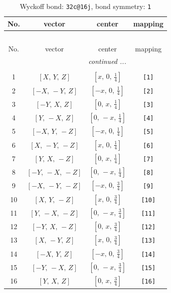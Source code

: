 \documentclass[fleqn,8pt]{jsarticle}
\begin{document}
\begin{longtable}{cccc}
\caption{Wyckoff bond: {\tt 32c@16j}, bond symmetry: {\tt 1}}
 \\
 \hline \hline
No. & vector & center & mapping \\ \hline \endfirsthead

\multicolumn{3}{l}{\tablename\ \thetable{}} \\
 \hline \hline
No. & vector & center & mapping \\ \hline \endhead

 \hline \hline
\multicolumn{3}{r}{\footnotesize\it continued ...} \\ \endfoot

 \hline \hline
\multicolumn{3}{r}{} \\ \endlastfoot

1 & $\left[ X,\, Y,\, Z \right]$ & $\left[ x,\, 0,\, \frac{1}{4} \right]$ & {\tt [1]} \\ \hline
2 & $\left[ - X,\, - Y,\, Z \right]$ & $\left[ - x,\, 0,\, \frac{1}{4} \right]$ & {\tt [2]} \\ \hline
3 & $\left[ - Y,\, X,\, Z \right]$ & $\left[ 0,\, x,\, \frac{1}{4} \right]$ & {\tt [3]} \\ \hline
4 & $\left[ Y,\, - X,\, Z \right]$ & $\left[ 0,\, - x,\, \frac{1}{4} \right]$ & {\tt [4]} \\ \hline
5 & $\left[ - X,\, Y,\, - Z \right]$ & $\left[ - x,\, 0,\, \frac{1}{4} \right]$ & {\tt [5]} \\ \hline
6 & $\left[ X,\, - Y,\, - Z \right]$ & $\left[ x,\, 0,\, \frac{1}{4} \right]$ & {\tt [6]} \\ \hline
7 & $\left[ Y,\, X,\, - Z \right]$ & $\left[ 0,\, x,\, \frac{1}{4} \right]$ & {\tt [7]} \\ \hline
8 & $\left[ - Y,\, - X,\, - Z \right]$ & $\left[ 0,\, - x,\, \frac{1}{4} \right]$ & {\tt [8]} \\ \hline
9 & $\left[ - X,\, - Y,\, - Z \right]$ & $\left[ - x,\, 0,\, \frac{3}{4} \right]$ & {\tt [9]} \\ \hline
10 & $\left[ X,\, Y,\, - Z \right]$ & $\left[ x,\, 0,\, \frac{3}{4} \right]$ & {\tt [10]} \\ \hline
11 & $\left[ Y,\, - X,\, - Z \right]$ & $\left[ 0,\, - x,\, \frac{3}{4} \right]$ & {\tt [11]} \\ \hline
12 & $\left[ - Y,\, X,\, - Z \right]$ & $\left[ 0,\, x,\, \frac{3}{4} \right]$ & {\tt [12]} \\ \hline
13 & $\left[ X,\, - Y,\, Z \right]$ & $\left[ x,\, 0,\, \frac{3}{4} \right]$ & {\tt [13]} \\ \hline
14 & $\left[ - X,\, Y,\, Z \right]$ & $\left[ - x,\, 0,\, \frac{3}{4} \right]$ & {\tt [14]} \\ \hline
15 & $\left[ - Y,\, - X,\, Z \right]$ & $\left[ 0,\, - x,\, \frac{3}{4} \right]$ & {\tt [15]} \\ \hline
16 & $\left[ Y,\, X,\, Z \right]$ & $\left[ 0,\, x,\, \frac{3}{4} \right]$ & {\tt [16]} \\
\end{longtable}
\end{document}
